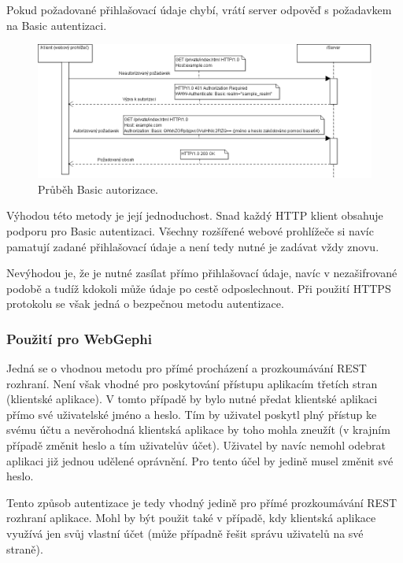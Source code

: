 \documentclass[thesis=M,czech]{FITthesis}[2014/05/6]
\begin{document}
Pokud požadované přihlašovací údaje chybí, vrátí server odpověď s požadavkem na Basic autentizaci.

\begin{figure}\centering
 	\includegraphics[width=1\textwidth]{images/diagram/auth_basic}
 	\caption[Průběh Basic autorizace]{Průběh Basic autorizace.}\label{fig:auth-basic}
\end{figure}

Výhodou této metody je její jednoduchost. Snad každý HTTP klient obsahuje podporu pro Basic autentizaci. Všechny rozšířené webové prohlížeče si navíc pamatují 
zadané přihlašovací údaje a není tedy nutné je zadávat vždy znovu.

Nevýhodou je, že je nutné zasílat přímo přihlašovací údaje, navíc v nezašifrované podobě a tudíž kdokoli může údaje po cestě odposlechnout. Při použití HTTPS protokolu se však
jedná o bezpečnou metodu autentizace.

\subsubsection{Použití pro WebGephi}
Jedná se o vhodnou metodu pro přímé procházení a prozkoumávání REST rozhraní. Není však vhodné pro poskytování přístupu aplikacím třetích stran (klientské aplikace).
V tomto případě by bylo nutné předat klientské aplikaci přímo své uživatelské jméno a heslo. Tím by uživatel poskytl plný přístup ke svému účtu a nevěrohodná klientská
aplikace by toho mohla zneužít (v krajním případě změnit heslo a tím  uživatelův účet). Uživatel by navíc nemohl odebrat aplikaci již jednou udělené oprávnění. 
Pro tento účel by jedině musel změnit své heslo.

Tento způsob autentizace je tedy vhodný jedině pro přímé prozkoumávání REST rozhraní aplikace. Mohl by být použit také v případě,
kdy klientská aplikace využívá jen svůj vlastní účet (může případně řešit správu uživatelů na své straně). 
\end{document}
